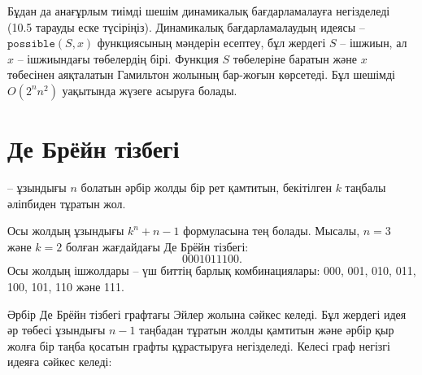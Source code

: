 Бұдан да анағұрлым тиімді шешім динамикалық бағдарламалауға негізделеді 
(10.5 тарауды еске түсіріңіз). Динамикалық бағдарламалаудың
идеясы -- $\texttt{possible}(S,x)$ функциясының
мәндерін есептеу, бұл жердегі $S$ -- ішжиын, ал $x$ -- ішжиындағы төбелердің бірі.
Функция $S$ төбелеріне баратын және $x$ төбесінен аяқталатын 
Гамильтон жолының бар-жоғын көрсетеді. 
Бұл шешімді $O(2^n n^2)$ уақытында жүзеге асыруға болады.

\section{Де Брёйн тізбегі}


 -- ұзындығы $n$ болатын әрбір жолды бір рет қамтитын, бекітілген $k$ таңбалы әліпбиден тұратын жол.

Осы жолдың ұзындығы $k^n+n-1$ формуласына тең болады.
Мысалы, $n=3$ және $k=2$ болған жағдайдағы Де Брёйн тізбегі:
\[0001011100.\]
Осы жолдың ішжолдары -- үш биттің барлық комбинациялары:
000, 001, 010, 011, 100, 101, 110 және 111.

Әрбір Де Брёйн тізбегі графтағы Эйлер жолына сәйкес келеді.
Бұл жердегі идея әр төбесі ұзындығы $n-1$ таңбадан тұратын жолды
қамтитын және әрбір қыр жолға бір таңба қосатын графты құрастыруға негізделеді. 
Келесі граф негізгі идеяға сәйкес келеді:


